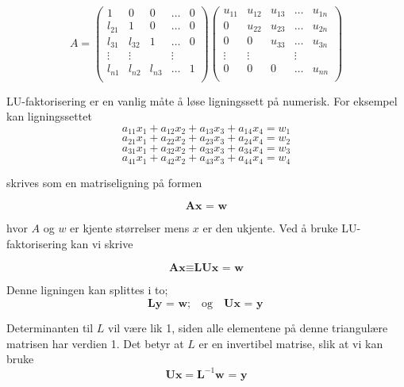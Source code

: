 \documentclass{article}
\begin{document}
\begin{equation}
 A = \left(\begin{array}{cccccc}
                          1 & 0 & 0 &\dots    & 0 \\
                           l_{21} & 1 & 0 &\dots &0 \\
                           l_{31} & l_{32} & 1 & \dots &0 \\
                          \vdots  & \vdots   &    &\vdots   \\
                           l_{n1 }& l_{n2}  & l_{n3}  &\dots  &1 \\                         
                      \end{array} \right) 
                      \left(\begin{array}{cccccc}
                          u_{11} & u_{12} & u_{13} &\dots  & u_{1n} \\
                           0 & u_{22} & u_{23} &\dots & u_{2n} \\
                           0 & 0 & u_{33} & \dots & u_{3n} \\
                          \vdots  & \vdots   &    &\vdots   \\
                           0 & 0   & 0  &\dots  & u_{nn} \\                         
                      \end{array} \right)
\end{equation}


LU-faktorisering er en vanlig måte å løse ligningssett på numerisk. For eksempel kan ligningssettet
\[a_{11}x_1 + a_{12}x_2 + a_{13}x_3 + a_{14}x_4 = w_1\]
\[a_{21}x_1 + a_{22}x_2 + a_{23}x_3 + a_{24}x_4 = w_2\]
\[a_{31}x_1 + a_{32}x_2 + a_{33}x_3 + a_{34}x_4 = w_3\]
\[a_{41}x_1 + a_{42}x_2 + a_{43}x_3 + a_{44}x_4 = w_4\]

skrives som en matriseligning på formen

\[\textbf{Ax = w}\]

hvor $A$ og $w$ er kjente størrelser mens $x$ er den ukjente. Ved å bruke LU-faktorisering kan vi skrive

\[\textbf{Ax} \equiv \textbf{LUx = w}\]

Denne ligningen kan splittes i to;
\[\textbf{Ly = w}; \quad \textrm{og} \quad \textbf{Ux = y} \]

Determinanten til $L$ vil være lik 1, siden alle elementene på denne triangulære matrisen har verdien 1. Det betyr at $L$ er en invertibel matrise, slik at vi kan bruke
\[\textbf{Ux} = \textbf{L}^{-1} \textbf{w = y} \]
\end{document}
